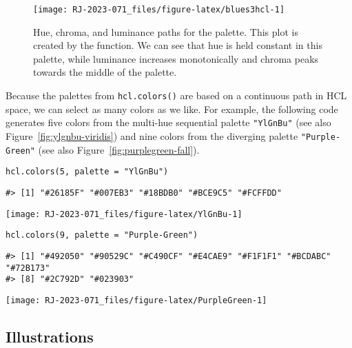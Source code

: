 \begin{figure}[ht!]

{\centering \texttt{[image: RJ-2023-071\_files/figure-latex/blues3hcl-1]} 

}

\caption{Hue, chroma, and luminance paths for the  palette. This plot is created by the  function.  We can see that hue is held constant in this palette, while luminance increases monotonically and chroma peaks towards the middle of the palette.}\label{fig:blues3hcl}
\end{figure}

Because the palettes from \texttt{hcl.colors()} are based on a continuous
path in HCL space, we can select as many colors as we like.
For example,
the following code generates five colors from the multi-hue sequential
palette \texttt{"YlGnBu"} (see also Figure~\ref{fig:ylgnbu-viridis})
and nine colors from the diverging palette \texttt{"Purple-Green"}
(see also Figure~\ref{fig:purplegreen-fall}).

\begin{verbatim}
hcl.colors(5, palette = "YlGnBu")
\end{verbatim}

\begin{verbatim}
#> [1] "#26185F" "#007EB3" "#18BDB0" "#BCE9C5" "#FCFFDD"
\end{verbatim}

\texttt{[image: RJ-2023-071\_files/figure-latex/YlGnBu-1]}

\begin{verbatim}
hcl.colors(9, palette = "Purple-Green")
\end{verbatim}

\begin{verbatim}
#> [1] "#492050" "#90529C" "#C490CF" "#E4CAE9" "#F1F1F1" "#BCDABC" "#72B173"
#> [8] "#2C792D" "#023903"
\end{verbatim}

\texttt{[image: RJ-2023-071\_files/figure-latex/PurpleGreen-1]}

\hypertarget{illustrations}{%
\subsection{Illustrations}\label{illustrations}}

